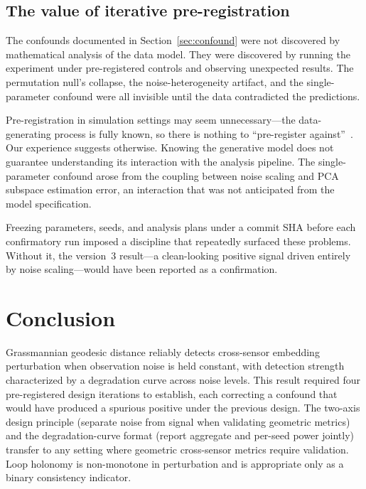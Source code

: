\documentclass[11pt]{article}
\begin{document}
\subsection{The value of iterative pre-registration}

The confounds documented in Section~\ref{sec:confound} were not
discovered by mathematical analysis of the data model.  They were
discovered by running the experiment under pre-registered controls
and observing unexpected results.  The permutation null's collapse,
the noise-heterogeneity artifact, and the single-parameter
confound were all invisible until the data contradicted the
predictions.

Pre-registration in simulation settings may seem
unnecessary---the data-generating process is fully known, so there
is nothing to ``pre-register
against''~\citep{simmons2011false}.  Our experience suggests
otherwise.  Knowing the generative model does not guarantee
understanding its interaction with the analysis pipeline.  The
single-parameter confound arose from the coupling between noise
scaling and PCA subspace estimation error, an interaction that was
not anticipated from the model specification.

Freezing parameters, seeds, and analysis plans under a commit SHA
before each confirmatory run imposed a discipline that repeatedly
surfaced these problems.  Without it, the version~3 result---a
clean-looking positive signal driven entirely by noise
scaling---would have been reported as a confirmation.

\section{Conclusion}
\label{sec:conclusion}

Grassmannian geodesic distance reliably detects cross-sensor
embedding perturbation when observation noise is held constant,
with detection strength characterized by a degradation curve across
noise levels.  This result required four pre-registered design
iterations to establish, each correcting a confound that would have
produced a spurious positive under the previous design.  The
two-axis design principle (separate noise from signal when
validating geometric metrics) and the degradation-curve format
(report aggregate and per-seed power jointly) transfer to any
setting where geometric cross-sensor metrics require validation.
Loop holonomy is non-monotone in perturbation and is appropriate
only as a binary consistency indicator.
\end{document}
